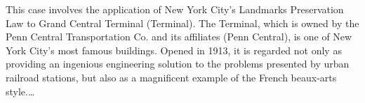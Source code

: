 
This case involves the application of New York City's Landmarks Preservation Law
to Grand Central Terminal (Terminal). The Terminal, which is owned by the Penn
Central Transportation Co. and its affiliates (Penn Central), is one of New York
City's most famous buildings. Opened in 1913, it is regarded not only as
providing an ingenious engineering solution to the problems presented by urban
railroad stations, but also as a magnificent example of the French beaux-arts
style.\ldots



